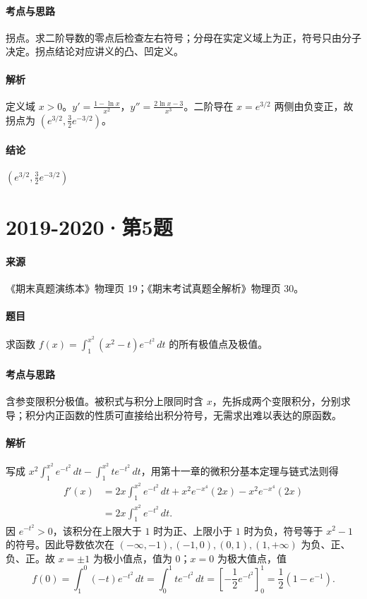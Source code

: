 \documentclass[UTF8,fontset=fandol,12pt,oneside,openany]{ctexrep}
\theoremstyle{definition}
\begin{document}
\paragraph{考点与思路}
拐点。求二阶导数的零点后检查左右符号；分母在实定义域上为正，符号只由分子决定。拐点结论对应讲义的凸、凹定义。
\paragraph{解析}
定义域 $x>0$。$y'=\frac{1-\ln x}{x^2}$，$y''=\frac{2\ln x-3}{x^3}$。二阶导在 $x=e^{3/2}$ 两侧由负变正，故拐点为 $(e^{3/2},\frac32e^{-3/2})$。
\paragraph{结论}
$\left(e^{3/2},\frac32e^{-3/2}\right)$

\par\addvspace{18pt}\noindent\begin{minipage}{\linewidth}
\section{2019-2020·第5题}
\paragraph{来源}《期末真题演练本》物理页 19；《期末考试真题全解析》物理页 30。
\paragraph{题目}
求函数 $f(x)=\int_1^{x^2}(x^2-t)e^{-t^2}\,dt$ 的所有极值点及极值。
\end{minipage}\par
\paragraph{考点与思路}
含参变限积分极值。被积式与积分上限同时含 $x$，先拆成两个变限积分，分别求导；积分内正函数的性质可直接给出积分符号，无需求出难以表达的原函数。
\paragraph{解析}
写成 $x^2\int_1^{x^2}e^{-t^2}\,dt-\int_1^{x^2}te^{-t^2}\,dt$，用第十一章的微积分基本定理与链式法则得
\begin{align*}
f'(x)&=2x\int_1^{x^2}e^{-t^2}\,dt+x^2e^{-x^4}(2x)-x^2e^{-x^4}(2x)\\
&=2x\int_1^{x^2}e^{-t^2}\,dt.
\end{align*}
因 $e^{-t^2}>0$，该积分在上限大于 $1$ 时为正、上限小于 $1$ 时为负，符号等于 $x^2-1$ 的符号。因此导数依次在 $(-\infty,-1),(-1,0),(0,1),(1,+\infty)$ 为负、正、负、正。故 $x=\pm1$ 为极小值点，值为 $0$；$x=0$ 为极大值点，值
\[f(0)=\int_1^0(-t)e^{-t^2}\,dt=\int_0^1te^{-t^2}\,dt
=\left[-\frac12e^{-t^2}\right]_0^1=\frac12(1-e^{-1}).\]
\end{document}
